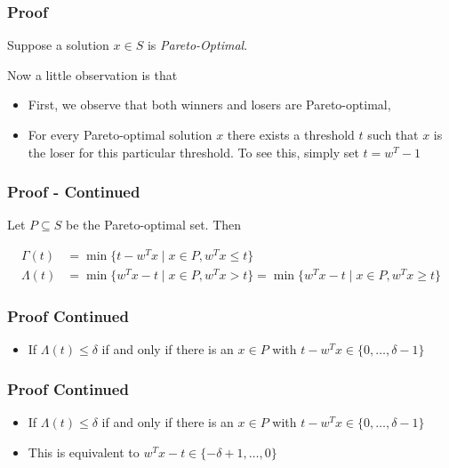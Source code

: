 \begin{frame}
    \frametitle{Proof}

    Suppose a solution $x \in S$ is \textit{Pareto-Optimal}.

    Now a little observation is that

    \begin{itemize}
        \item First, we observe that both winners and losers are Pareto-optimal,
        \item For every Pareto-optimal solution $x$ there exists a threshold $t$ such that
              $x$ is the loser for this particular threshold. To see this, simply set $t =
                  w^T - 1$
    \end{itemize}

\end{frame}

\begin{frame}
    \frametitle{Proof - Continued}

    Let $P \subseteq S$ be the Pareto-optimal set. Then

    \begin{align*}
        \Gamma(t)  & = \min \{t - w^T x \mid x \in P, w^T x \leq t\}                                              \\
        \Lambda(t) & = \min \{w^T x - t \mid x \in P, w^T x > t\} = \min \{w^T x - t \mid x \in P, w^T x \geq t\}
    \end{align*}

\end{frame}

\begin{frame}
    \frametitle{Proof Continued}

    \begin{itemize}
        \item If $\Lambda(t) \leq \delta$ if and only if there is an $x \in P$ with $t - w^T
                  x \in \{0, \dots, \delta - 1\}$
    \end{itemize}

\end{frame}

\begin{frame}
    \frametitle{Proof Continued}

    \begin{itemize}
        \item If $\Lambda(t) \leq \delta$ if and only if there is an $x \in P$ with $t - w^T
                  x \in \{0, \dots, \delta - 1\}$
        \item This is equivalent to $w^T x - t \in \{-\delta + 1, \dots, 0\}$
    \end{itemize}
\end{frame}

